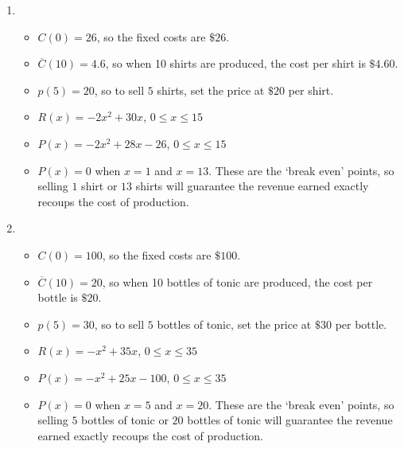 \documentclass{ximera}
\begin{document}
\begin{enumerate}
\setcounter{enumi}{\value{HW}}

\item \begin{itemize}

\item  $C(0) = 26$, so the fixed costs are $\$26$.

\item  $\overline{C}(10) = 4.6$, so when 10 shirts are produced, the cost per shirt is $\$4.60$.

\item  $p(5) = 20$, so to sell $5$ shirts, set the price at $\$20$ per shirt.

\item $R(x) = -2x^2+30x$, $0 \leq x \leq 15$

\item  $P(x) = -2x^2+28x-26$, $0 \leq x \leq 15$

\item  $P(x) = 0$ when $x = 1$ and $x=13$.  These are the `break even' points, so selling $1$ shirt or $13$ shirts will guarantee the revenue earned exactly recoups the cost of production.

\end{itemize}


\item \begin{itemize}

\item  $C(0) = 100$, so the fixed costs are $\$100$.

\item  $\overline{C}(10) = 20$, so when 10 bottles of tonic are produced, the cost per bottle is $\$20$.

\item  $p(5) = 30$, so to sell $5$ bottles of tonic, set the price at $\$30$ per bottle.

\item $R(x) = -x^2+35x$, $0 \leq x \leq 35$

\item  $P(x) = -x^2+25x-100$, $0 \leq x \leq 35$

\item  $P(x) = 0$ when $x = 5$ and $x=20$.  These are the `break even' points, so selling $5$ bottles of tonic or $20$ bottles of tonic will guarantee the revenue earned exactly recoups the cost of production.

\end{itemize}



\end{enumerate}
\end{document}
